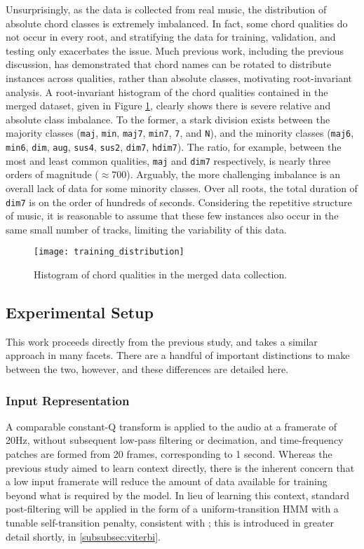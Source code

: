 Unsurprisingly, as the data is collected from real music, the distribution of absolute chord classes is extremely imbalanced.
In fact, some chord qualities do not occur in every root, and stratifying the data for training, validation, and testing only exacerbates the issue.
Much previous work, including the previous discussion, has demonstrated that chord names can be rotated to distribute instances across qualities, rather than absolute classes, motivating root-invariant analysis.
A root-invariant histogram of the chord qualities contained in the merged dataset, given in Figure \ref{fig:training_distribution}, clearly shows there is severe relative and absolute class imbalance.
To the former, a stark division exists between the majority classes (\texttt{maj}, \texttt{min}, \texttt{maj7}, \texttt{min7}, \texttt{7}, and \texttt{N}), and the minority classes (\texttt{maj6}, \texttt{min6}, \texttt{dim}, \texttt{aug}, \texttt{sus4}, \texttt{sus2}, \texttt{dim7}, \texttt{hdim7}).
The ratio, for example, between the most and least common qualities, \texttt{maj} and \texttt{dim7} respectively, is nearly three orders of magnitude ($\approx 700$).
Arguably, the more challenging imbalance is an overall lack of data for some minority classes.
Over all roots, the total duration of \texttt{dim7} is on the order of hundreds of seconds.
Considering the repetitive structure of music, it is reasonable to assume that these few instances also occur in the same small number of tracks, limiting the variability of this data.

\begin{figure}[!t]
\centering
\texttt{[image: training\_distribution]}
\caption{Histogram of chord qualities in the merged data collection.}
\label{fig:training_distribution}
\end{figure}


\subsection{Experimental Setup}
\label{subsec:experimental_setup}
This work proceeds directly from the previous study, and takes a similar approach in many facets.
There are a handful of important distinctions to make between the two, however, and these differences are detailed here.

\subsubsection{Input Representation}
\label{subsubsec:data_considerations}
A comparable constant-Q transform is applied to the audio at a framerate of 20Hz, without subsequent low-pass filtering or decimation, and time-frequency patches are formed from 20 frames, corresponding to 1 second.
Whereas the previous study aimed to learn context directly, there is the inherent concern that a low input framerate will reduce the amount of data available for training beyond what is required by the model.
In lieu of learning this context, standard post-filtering will be applied in the form of a uniform-transition HMM with a tunable self-transition penalty, consistent with \cite{Cho2014Improved}; this is introduced in greater detail shortly, in \ref{subsubsec:viterbi}.

